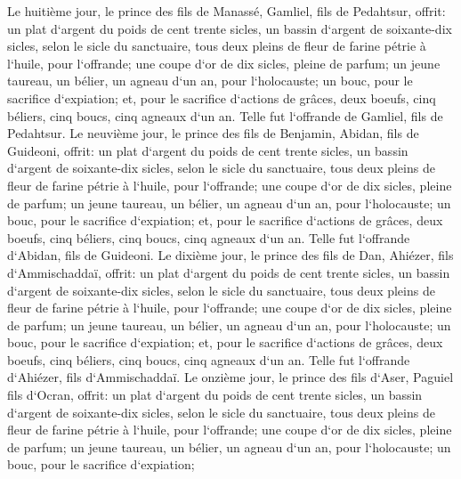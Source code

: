 \verse Le huitième jour, le prince des fils de Manassé, Gamliel, fils de Pedahtsur, 
\verse offrit: un plat d`argent du poids de cent trente sicles, un bassin d`argent de soixante-dix sicles, selon le sicle du sanctuaire, tous deux pleins de fleur de farine pétrie à l`huile, pour l`offrande; 
\verse une coupe d`or de dix sicles, pleine de parfum; 
\verse un jeune taureau, un bélier, un agneau d`un an, pour l`holocauste; 
\verse un bouc, pour le sacrifice d`expiation; 
\verse et, pour le sacrifice d`actions de grâces, deux boeufs, cinq béliers, cinq boucs, cinq agneaux d`un an. Telle fut l`offrande de Gamliel, fils de Pedahtsur. 
\verse Le neuvième jour, le prince des fils de Benjamin, Abidan, fils de Guideoni, 
\verse offrit: un plat d`argent du poids de cent trente sicles, un bassin d`argent de soixante-dix sicles, selon le sicle du sanctuaire, tous deux pleins de fleur de farine pétrie à l`huile, pour l`offrande; 
\verse une coupe d`or de dix sicles, pleine de parfum; 
\verse un jeune taureau, un bélier, un agneau d`un an, pour l`holocauste; 
\verse un bouc, pour le sacrifice d`expiation; 
\verse et, pour le sacrifice d`actions de grâces, deux boeufs, cinq béliers, cinq boucs, cinq agneaux d`un an. Telle fut l`offrande d`Abidan, fils de Guideoni. 
\verse Le dixième jour, le prince des fils de Dan, Ahiézer, fils d`Ammischaddaï, 
\verse offrit: un plat d`argent du poids de cent trente sicles, un bassin d`argent de soixante-dix sicles, selon le sicle du sanctuaire, tous deux pleins de fleur de farine pétrie à l`huile, pour l`offrande; 
\verse une coupe d`or de dix sicles, pleine de parfum; 
\verse un jeune taureau, un bélier, un agneau d`un an, pour l`holocauste; 
\verse un bouc, pour le sacrifice d`expiation; 
\verse et, pour le sacrifice d`actions de grâces, deux boeufs, cinq béliers, cinq boucs, cinq agneaux d`un an. Telle fut l`offrande d`Ahiézer, fils d`Ammischaddaï. 
\verse Le onzième jour, le prince des fils d`Aser, Paguiel fils d`Ocran, 
\verse offrit: un plat d`argent du poids de cent trente sicles, un bassin d`argent de soixante-dix sicles, selon le sicle du sanctuaire, tous deux pleins de fleur de farine pétrie à l`huile, pour l`offrande; 
\verse une coupe d`or de dix sicles, pleine de parfum; 
\verse un jeune taureau, un bélier, un agneau d`un an, pour l`holocauste; 
\verse un bouc, pour le sacrifice d`expiation; 

